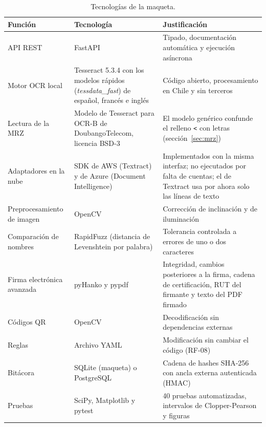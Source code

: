 \documentclass[11pt,a4paper]{article}
\begin{document}
\begin{table}[!htbp]
\centering
\caption{Tecnologías de la maqueta.}
\label{tab:stack}
\small
\begin{tabularx}{\textwidth}{>{\raggedright\arraybackslash}p{3.4cm} >{\raggedright\arraybackslash}p{4.6cm} L}
\toprule
\textbf{Función} & \textbf{Tecnología} & \textbf{Justificación} \\
\midrule
API REST & FastAPI & Tipado, documentación automática y ejecución asíncrona \\
Motor OCR local & Tesseract 5.3.4 con los modelos rápidos (\emph{tessdata\_fast}) de español, francés e inglés \cite{smith2007} & Código abierto, procesamiento en Chile y sin terceros \\
Lectura de la MRZ & Modelo de Tesseract para OCR-B de DoubangoTelecom, licencia BSD-3 \cite{doubango} & El modelo genérico confunde el relleno \texttt{<} con letras (sección~\ref{sec:mrz}) \\
Adaptadores en la nube & SDK de AWS (Textract) y de Azure (Document Intelligence) & Implementados con la misma interfaz; no ejecutados por falta de cuentas; el de Textract usa por ahora solo las líneas de texto \\
Preprocesamiento de imagen & OpenCV & Corrección de inclinación y de iluminación \\
Comparación de nombres & RapidFuzz (distancia de Levenshtein por palabra) & Tolerancia controlada a errores de uno o dos caracteres \\
Firma electrónica avanzada & pyHanko y pypdf & Integridad, cambios posteriores a la firma, cadena de certificación, RUT del firmante y texto del PDF firmado \\
Códigos QR & OpenCV & Decodificación sin dependencias externas \\
Reglas & Archivo YAML & Modificación sin cambiar el código (RF-08) \\
Bitácora & SQLite (maqueta) o PostgreSQL & Cadena de hashes SHA-256 con ancla externa autenticada (HMAC) \\
Pruebas & SciPy, Matplotlib y pytest & 40 pruebas automatizadas, intervalos de Clopper-Pearson y figuras \\
\bottomrule
\end{tabularx}
\end{table}
\end{document}
